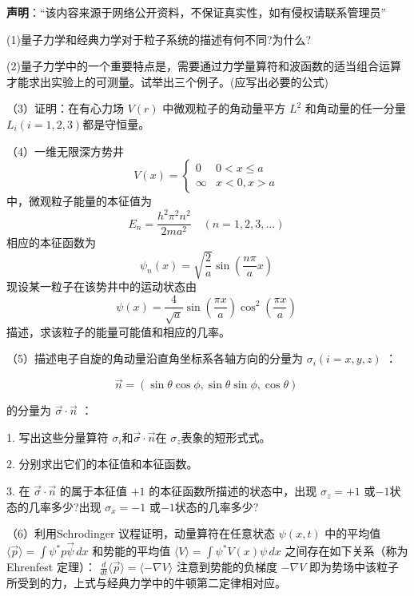 
\textbf{声明}：“该内容来源于网络公开资料，不保证真实性，如有侵权请联系管理员”

(1)量子力学和经典力学对于粒子系统的描述有何不同?为什么?

(2)量子力学中的一个重要特点是，需要通过力学量算符和波函数的适当组合运算才能求出实验上的可测量。试举出三个例子。(应写出必要的公式)

（3）证明：在有心力场 $V(r)$ 中微观粒子的角动量平方 $ L^2 $ 和角动量的任一分量 $L_i (i=1,2,3)$都是守恒量。

（4）一维无限深方势井
$$V(x) = 
\begin{cases} 
0 & 0 < x \leq a \\
\infty & x < 0, x > a 
\end{cases}~$$
中，微观粒子能量的本征值为
$$E_n = \frac{h^2 \pi^2 n^2}{2ma^2} \quad (n = 1, 2, 3, \ldots)~$$
相应的本征函数为
$$\psi_n(x) = \sqrt{\frac{2}{a}} \sin \left( \frac{n \pi }{a} x \right)~$$
现设某一粒子在该势井中的运动状态由
$$\psi(x) = \frac{4}{\sqrt{a}} \sin \left( \frac{\pi x}{a} \right) \cos^2 \left( \frac{\pi x}{a} \right)~$$
描述，求该粒子的能量可能值和相应的几率。

（5）描述电子自旋的角动量沿直角坐标系各轴方向的分量为 $\sigma_i (i=x,y,z)$ ：

$$\vec{n} = (\sin \theta \cos \phi, \sin \theta \sin \phi, \cos \theta)~$$

的分量为 $\vec{\sigma} \cdot \vec{n}$ ：

1. 写出这些分量算符 $\sigma_i$和$\vec{\sigma} \cdot \vec{n}$在 $\sigma_z$表象的短形式式。

2. 分别求出它们的本征值和本征函数。

3. 在 $\vec{\sigma} \cdot \vec{n}$ 的属于本征值 $+1$ 的本征函数所描述的状态中，出现 $\sigma_z = +1$ 或$-1$状态的几率多少?出现 $\sigma_x = -1$ 或$-1$状态的几率多少?

（6）利用Schrodinger 议程证明，动量算符在任意状态 $\psi(x,t)$ 中的平均值
$\langle \vec{p} \rangle = \int \psi^* p\vec{\psi}\, dx $
和势能的平均值
$\langle V \rangle = \int \psi^* V(x) \psi \, dx $
之间存在如下关系（称为Ehrenfest 定理）：
$ \frac{d}{dt} \langle \vec{p} \rangle = \langle -\nabla V \rangle $
注意到势能的负梯度 $ - \nabla V $ 即为势场中该粒子所受到的力，上式与经典力学中的牛顿第二定律相对应。